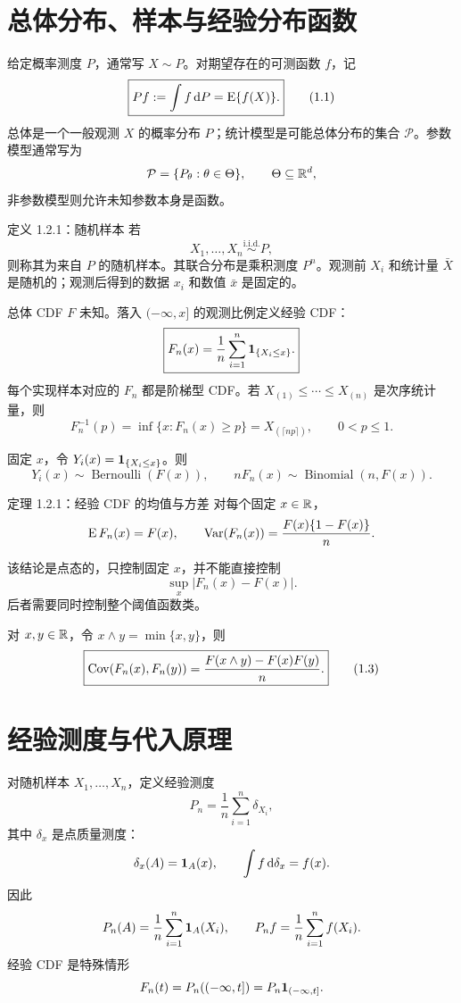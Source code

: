 \section{总体分布、样本与经验分布函数}

给定概率测度 $P$，通常写 $X\sim P$。对期望存在的可测函数 $f$，记
\[
 \boxed{Pf:=\int f\,\mathrm dP=\operatorname{E}\{f(X)\}.}
 \tag{1.1}
\]
总体是一个一般观测 $X$ 的概率分布 $P$；统计模型是可能总体分布的集合 $\mathcal P$。参数模型通常写为
\[
 \mathcal P=\{P_\theta:\theta\in\Theta\},
 \qquad \Theta\subseteq\mathbb R^d,
\]
非参数模型则允许未知参数本身是函数。

\begin{definitionbox}{定义 1.2.1：随机样本}
若
\[
 X_1,\ldots,X_n\overset{\mathrm{i.i.d.}}{\sim}P,
\]
则称其为来自 $P$ 的随机样本。其联合分布是乘积测度 $P^n$。观测前 $X_i$ 和统计量 $\bar X$ 是随机的；观测后得到的数据 $x_i$ 和数值 $\bar x$ 是固定的。
\end{definitionbox}

总体 CDF $F$ 未知。落入 $(-\infty,x]$ 的观测比例定义经验 CDF：
\[
 \boxed{F_n(x)=\frac1n\sum_{i=1}^n\mathbf 1_{\{X_i\leq x\}}.}
\]
每个实现样本对应的 $F_n$ 都是阶梯型 CDF。若 $X_{(1)}\leq\cdots\leq X_{(n)}$ 是次序统计量，则
\[
 F_n^{-1}(p)=\inf\{x:F_n(x)\geq p\}
 =X_{(\lceil np\rceil)},
 \qquad 0<p\leq1.
\]

固定 $x$，令 $Y_i(x)=\mathbf 1_{\{X_i\leq x\}}$。则
\[
 Y_i(x)\sim\operatorname{Bernoulli}(F(x)),
 \qquad
 nF_n(x)\sim\operatorname{Binomial}(n,F(x)).
 \tag{1.2}
\]

\begin{definitionbox}{定理 1.2.1：经验 CDF 的均值与方差}
对每个固定 $x\in\mathbb R$，
\[
 \operatorname{E} F_n(x)=F(x),
 \qquad
 \operatorname{Var}(F_n(x))=\frac{F(x)\{1-F(x)\}}n.
\]
\end{definitionbox}

该结论是点态的，只控制固定 $x$，并不能直接控制
\[
 \sup_x|F_n(x)-F(x)|.
\]
后者需要同时控制整个阈值函数类。

对 $x,y\in\mathbb R$，令 $x\wedge y=\min\{x,y\}$，则
\[
 \boxed{
 \operatorname{Cov}(F_n(x),F_n(y))
 =\frac{F(x\wedge y)-F(x)F(y)}n.}
 \tag{1.3}
\]

\section{经验测度与代入原理}

对随机样本 $X_1,\ldots,X_n$，定义经验测度
\[
 \boxed{P_n=\frac1n\sum_{i=1}^n\delta_{X_i}},
\]
其中 $\delta_x$ 是点质量测度：
\[
 \delta_x(A)=\mathbf 1_A(x),
 \qquad
 \int f\,\mathrm d\delta_x=f(x).
\]
因此
\[
 P_n(A)=\frac1n\sum_{i=1}^n\mathbf 1_A(X_i),
 \qquad
 P_nf=\frac1n\sum_{i=1}^nf(X_i).
\]
经验 CDF 是特殊情形
\[
 F_n(t)=P_n((-\infty,t])=P_n\mathbf 1_{(-\infty,t]}.
\]

